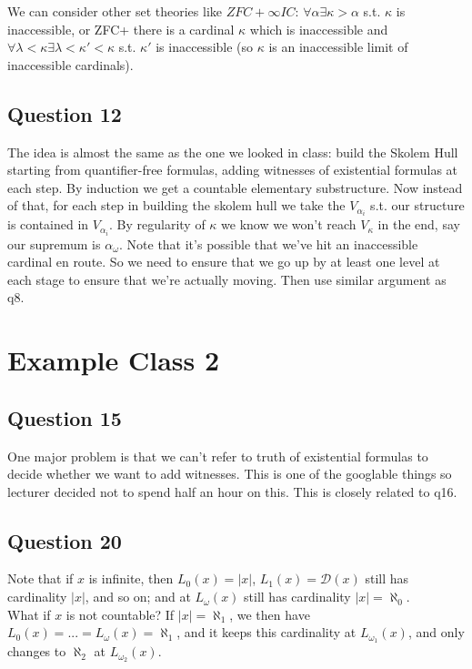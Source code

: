 \documentclass[a4paper]{article}
\begin{document}
We can consider other set theories like $ZFC+\infty IC$: $\forall \alpha \exists \kappa > \alpha$ s.t. $\kappa$ is inaccessible, or ZFC+ there is a cardinal $\kappa$ which is inaccessible and $\forall \lambda < \kappa \exists \lambda < \kappa' < \kappa$ s.t. $\kappa'$ is inaccessible (so $\kappa$ is an inaccessible limit of inaccessible cardinals).

\subsection{Question 12}
The idea is almost the same as the one we looked in class: build the Skolem Hull starting from quantifier-free formulas, adding witnesses of existential formulas at each step. By induction we get a countable elementary substructure. Now instead of that, for each step in building the skolem hull we take the $V_{\alpha_i}$ s.t. our structure is contained in $V_{\alpha_i}$. By regularity of $\kappa$ we know we won't reach $V_\kappa$ in the end, say our supremum is $\alpha_\omega$. Note that it's possible that we've hit an inaccessible cardinal en route. So we need to ensure that we go up by at least one level at each stage to ensure that we're actually moving. Then use similar argument as q8.

\newpage

\section{Example Class 2}

\subsection{Question 15}

One major problem is that we can't refer to truth of existential formulas to decide whether we want to add witnesses. This is one of the googlable things so lecturer decided not to spend half an hour on this. This is closely related to q16.

\subsection{Question 20}
Note that if $x$ is infinite, then $L_0(x) = |x|$, $L_1(x) = \mathcal{D}(x)$ still has cardinality $|x|$, and so on; and at $L_\omega(x)$ still has cardinality $|x| = \aleph_0$.\\
What if $x$ is not countable? If $|x| = \aleph_1$, we then have $L_0(x) = ... = L_\omega(x)=\aleph_1$, and it keeps this cardinality at $L_{\omega_1}(x)$, and only changes to $\aleph_2$ at $L_{\omega_2}(x)$.
\end{document}

